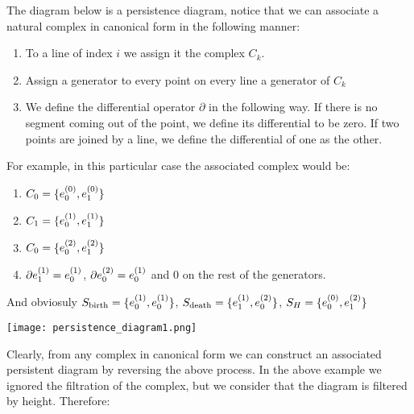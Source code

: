 \begin{example}
The diagram below is a persistence diagram, notice that we can associate a natural 
complex in canonical form in the following manner:

\begin{enumerate}


\item To a line of index $i$ we assign
it the complex $C_k$.

\item Assign a generator to every point on every line a generator of $C_k$

\item We define the differential operator $\partial$
in the following way. If there is no segment coming out of the point, we define its differential to be zero.
If two points are joined by a line, we define the differential of one as the other.

\end{enumerate}

For example, in this particular case the associated complex would be:

\begin{enumerate}

\item $C_0 = \{e_{0}^{(0)},e_{1}^{(0)}\}$

\item $C_1 = \{e_{0}^{(1)},e_{1}^{(1)}\}$

\item $C_0 = \{e_{0}^{(2)},e_{1}^{(2)}\}$

\item $\partial e_{1}^{(1)}=e_{0}^{(1)}$, $\partial e_{0}^{(2)}=e_{0}^{(1)}$ and 
$0$ on the rest of the generators.
\end{enumerate}

And obviosuly $S_{\text{birth}}=\{
e_{0}^{(1)},
e_{0}^{(1)}
\}$,
$S_{\text{death}}=\{
e_{1}^{(1)},
e_{0}^{(2)}
\}$,
$
S_H=\{
e_{0}^{(0)},
e_{1}^{(2)}
\}
$

\end{example}

\begin{center}
\texttt{[image: persistence\_diagram1.png]}
\end{center}


Clearly, from any complex in canonical form we can construct an associated persistent diagram by reversing the above process.
In the above example we ignored the filtration of the complex, but we consider that the diagram is filtered by height.
 Therefore:

